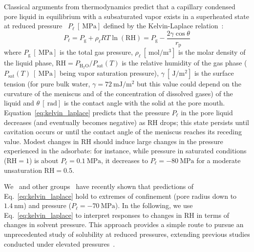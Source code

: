 \documentclass[aps,prl,twocolumn,superscriptaddress,groupedaddress]{revtex4}
\begin{document}
Classical arguments from thermodynamics predict that a capillary condensed pore liquid in equilibrium with a subsaturated vapor exists in a superheated state at reduced pressure~\cite{caupin_2012,wheeler_2009,chen_2016a} $P_\ell \ [\SI{}{\mega\pascal}]$ defined by the Kelvin-Laplace relation~\cite{wheeler_2008,gor_2017}:
\begin{equation}
P_\ell = P_\text{g} + \rho_\ell R T \ln{(\mathrm{RH})} = P_\text{g} - \frac{2\gamma \cos{\theta}}{r_\text{p}}
\label{eq:kelvin_laplace}
\end{equation}
\noindent where $P_\text{g} \ [\SI{}{\mega\pascal}]$ is the total gas pressure, $\rho_\ell \ [\SI{}{\mole\per\meter\cubed}]$ is the molar density of the liquid phase, $\mathrm{RH} = P_\mathrm{H_2O}/P_\text{sat}(T)$ is the relative humidity of the gas phase ($P_\text{sat}(T) \ [\SI{}{\mega\pascal}]$ being vapor saturation pressure), $\gamma \ [\SI{}{\joule\per\meter\squared}]$ is the surface tension (for pure bulk water, $\gamma=\SI{72}{\milli\joule\per\meter\squared}$ but this value could depend on the curvature of the meniscus and of the concentration of dissolved gases) of the liquid and $\theta \ [\SI{}{\radian}]$ is the contact angle with the solid at the pore mouth. Equation~\eqref{eq:kelvin_laplace} predicts that the pressure $P_\ell$ in the pore liquid decreases (and eventually becomes negative) as $\mathrm{RH}$ drops; this state persists until cavitation occurs or until the contact angle of the meniscus reaches its receding value. Modest changes in $\mathrm{RH}$ should induce large changes in the pressure experienced in the adsorbate: for instance, while pressure in saturated conditions ($\mathrm{RH} = 1$) is about $P_\ell = \SI{0.1}{\mega\pascal}$, it decreases to $P_\ell = -\SI{80}{\mega\pascal}$ for a moderate unsaturation $\mathrm{RH}=0.5$.

We~\cite{vincent_2014,vincent_2016,vincent_2017a} and other groups~\cite{gruener_2009,huber_2015} have recently shown that predictions of Eq.~\eqref{eq:kelvin_laplace} hold to extremes of confinement (pore radius down to $\SI{1.4}{\nano\meter}$) and pressure ($P_\ell = -\SI{70}{\mega\pascal}$). In the following, we use Eq.~\eqref{eq:kelvin_laplace} to interpret responses to changes in $\mathrm{RH}$  in terms of changes in solvent pressure. This approach provides a simple route to pursue an unprecedented study of solubility at reduced pressures, extending previous studies conducted under elevated pressures~\cite{taylor_1978}. %
\end{document}
